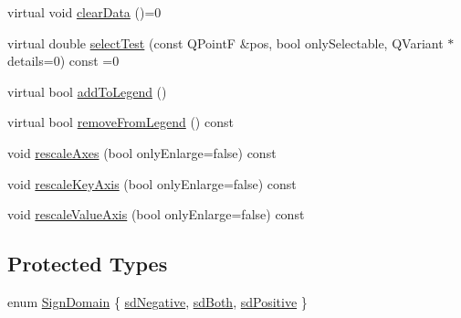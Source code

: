 \begin{DoxyCompactItemize}
\item 
virtual void \hyperlink{class_q_c_p_abstract_plottable_a86e5b8fd4b6ff4f4084e7ea4c573fc53}{clear\+Data} ()=0
\item 
virtual double \hyperlink{class_q_c_p_abstract_plottable_a38efe9641d972992a3d44204bc80ec1d}{select\+Test} (const Q\+Point\+F \&pos, bool only\+Selectable, Q\+Variant $\ast$details=0) const =0
\item 
virtual bool \hyperlink{class_q_c_p_abstract_plottable_a70f8cabfd808f7d5204b9f18c45c13f5}{add\+To\+Legend} ()
\item 
virtual bool \hyperlink{class_q_c_p_abstract_plottable_aa1f350e510326d012b9a9c9249736c83}{remove\+From\+Legend} () const 
\item 
void \hyperlink{class_q_c_p_abstract_plottable_a7e8fc3be43c27ccacd70a7bf9d74a5cd}{rescale\+Axes} (bool only\+Enlarge=false) const 
\item 
void \hyperlink{class_q_c_p_abstract_plottable_a1acecfcca3e7fcda00fcbaa3c886386f}{rescale\+Key\+Axis} (bool only\+Enlarge=false) const 
\item 
void \hyperlink{class_q_c_p_abstract_plottable_abfd0805eb1d955c0111a990246658324}{rescale\+Value\+Axis} (bool only\+Enlarge=false) const 
\end{DoxyCompactItemize}
\subsection*{Protected Types}
\begin{DoxyCompactItemize}
\item 
enum \hyperlink{class_q_c_p_abstract_plottable_a661743478a1d3c09d28ec2711d7653d8}{Sign\+Domain} \{ \hyperlink{class_q_c_p_abstract_plottable_a661743478a1d3c09d28ec2711d7653d8a0fc9a70796ef60ad18ddd18056e6dc63}{sd\+Negative}, 
\hyperlink{class_q_c_p_abstract_plottable_a661743478a1d3c09d28ec2711d7653d8a082b98cfb91a7363a3b5cd17b0c1cd60}{sd\+Both}, 
\hyperlink{class_q_c_p_abstract_plottable_a661743478a1d3c09d28ec2711d7653d8a02951859f243a4d24e779cfbb5471030}{sd\+Positive}
 \}
\end{DoxyCompactItemize}
